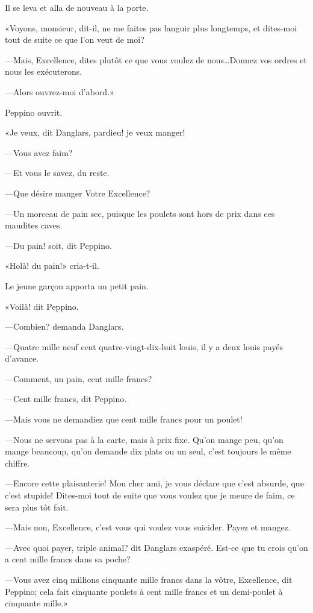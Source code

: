 Il se leva et alla de nouveau à la porte. 

«Voyons, monsieur, dit-il, ne me faites pas languir plus longtemps, et dites-moi tout de suite ce que l'on veut de moi? 

—Mais, Excellence, dites plutôt ce que vous voulez de nous\dots Donnez vos ordres et nous les exécuterons. 

—Alors ouvrez-moi d'abord.» 

Peppino ouvrit. 

«Je veux, dit Danglars, pardieu! je veux manger! 

—Vous avez faim? 

—Et vous le savez, du reste. 

—Que désire manger Votre Excellence? 

—Un morceau de pain sec, puisque les poulets sont hors de prix dans ces maudites caves. 

—Du pain! soit, dit Peppino. 

«Holà! du pain!» cria-t-il. 

Le jeune garçon apporta un petit pain. 

«Voilà! dit Peppino. 

—Combien? demanda Danglars. 

—Quatre mille neuf cent quatre-vingt-dix-huit louis, il y a deux louis payés d'avance. 

—Comment, un pain, cent mille francs? 

—Cent mille francs, dit Peppino. 

—Mais vous ne demandiez que cent mille francs pour un poulet! 

—Nous ne servons pas à la carte, mais à prix fixe. Qu'on mange peu, qu'on mange beaucoup, qu'on demande dix plats ou un seul, c'est toujours le même chiffre. 

—Encore cette plaisanterie! Mon cher ami, je vous déclare que c'est absurde, que c'est stupide! Dites-moi tout de suite que vous voulez que je meure de faim, ce sera plus tôt fait. 

—Mais non, Excellence, c'est vous qui voulez vous suicider. Payez et mangez. 

—Avec quoi payer, triple animal? dit Danglars exaspéré. Est-ce que tu crois qu'on a cent mille francs dans sa poche? 

—Vous avez cinq millions cinquante mille francs dans la vôtre, Excellence, dit Peppino; cela fait cinquante poulets à cent mille francs et un demi-poulet à cinquante mille.» 

